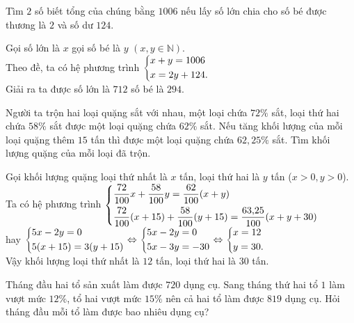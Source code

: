 \begin{bt}
	Tìm $ 2 $ số biết tổng của chúng bằng $ 1006 $ nếu lấy số lớn chia cho số bé được thương là $ 2 $ và số dư $ 124 $.	
	\loigiai
	{
		Gọi số lớn là $ x $ gọi số bé là $ y $  $ (x, y \in \mathbb{N}) $.\\
		Theo đề, ta có hệ phương trình $ \left\{\begin{aligned}&x+y=1006\\&x=2y+124.\end{aligned}\right. $\\
		Giải ra ta được số lớn là $ 712 $ số bé là $ 294 $.
		
	}
\end{bt}

\begin{bt}
	Người ta trộn hai loại quặng sắt với nhau, một loại chứa $ 72\% $ sắt, loại thứ hai chứa $ 58\% $ sắt được một loại quặng chứa $ 62\% $ sắt. Nếu tăng khối lượng của mỗi loại quặng thêm $ 15 $ tấn thì được một loại quặng chứa $ 62{,}25\% $ sắt. Tìm khối lượng quặng của mỗi loại đã trộn.	
	
	\loigiai
	{
		Gọi khối lượng quặng loại thứ nhất là $ x $ tấn, loại thứ hai là $ y $ tấn ($ x>0, y>0 $).\\
		Ta có hệ phương trình $ \left\{\begin{aligned}&\dfrac{72}{100}x+\dfrac{58}{100}y=\dfrac{62}{100}(x+y)\\&\dfrac{72}{100}(x+15)+\dfrac{58}{100}(y+15)=\dfrac{63{,}25}{100}(x+y+30)\end{aligned}\right. $\\
		hay $ \left\{\begin{aligned}&5x-2y=0\\&5(x+15)=3(y+15)\end{aligned}\right. \Leftrightarrow \left\{\begin{aligned}&5x-2y=0\\&5x-3y=-30\end{aligned}\right. \Leftrightarrow \left\{\begin{aligned}&x=12\\&y=30.\end{aligned}\right. $\\
		Vậy khối lượng loại thứ nhất là $ 12 $ tấn, loại thứ hai là $ 30 $ tấn.
	}
\end{bt}



\begin{bt}
	Tháng đầu hai tổ sản xuất làm được $720$ dụng cụ. Sang tháng thứ hai tổ $1$ làm vượt mức $12\%$, tổ hai vượt mức $15\%$ nên cả hai tổ làm được $819$ dụng cụ. Hỏi tháng đầu mỗi tổ làm được bao nhiêu dụng cụ?
\end{bt}

